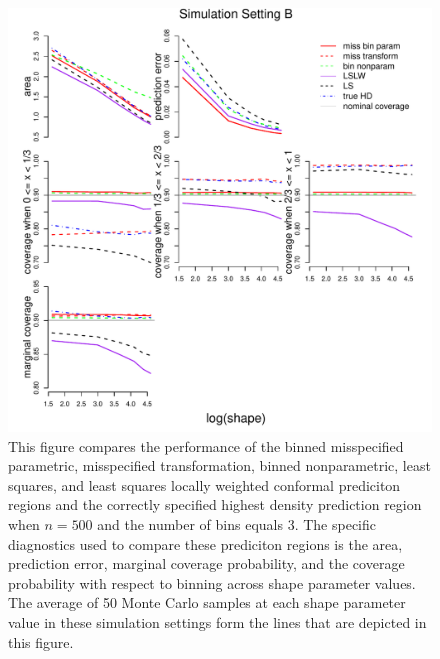 \documentclass[11pt]{article}\usepackage[]{graphicx}\usepackage[]{color}
\makeatletter
\def\maxwidth{ %
  \ifdim\Gin@nat@width>\linewidth
    \linewidth
  \else
    \Gin@nat@width
  \fi
}
\newenvironment{knitrout}{}{} %
\makeatother
\begin{document}
\newpage
\begin{figure}[h!]
\begin{center}
\begin{knitrout}
\color{fgcolor}
\includegraphics[width=\maxwidth]{figure/Fig-misspec-500-1} 

\end{knitrout}
\end{center}
\caption{This figure compares the performance of the 
  binned misspecified parametric, 
  misspecified transformation, 
  binned nonparametric,
  least squares, and 
  least squares locally weighted conformal prediciton regions and the 
  correctly specified highest density prediction region when $n = 500$ and the 
  number of bins equals 3.  
  The specific diagnostics used to compare these prediciton regions is the 
    area,
    prediction error, 
    marginal coverage probability,     
    and the coverage probability with respect to binning  
    across shape parameter values.
  The average of 50 Monte Carlo samples at each shape parameter value in 
  these simulation settings form the lines that are depicted in this figure.}
\label{Fig:misspec.500}
\end{figure}
\end{document}

